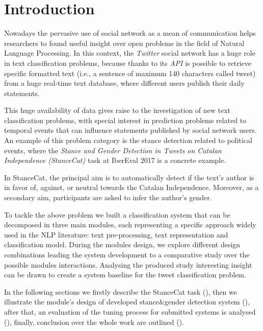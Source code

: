 \section{Introduction} \label{sec:introduction}

Nowadays the pervasive use of social network as a mean of communication helps researchers to found useful insight over open problems in the field of Natural Language Processing. %
In this context, the \emph{Twitter} social network has a huge role in text classification problems, because thanks to its \emph{API} is possible to retrieve specific formatted text (i.e., a sentence of maximum 140 characters called tweet) from a huge real-time text database, where different users publish their daily statements.

This huge availability of data gives raise to the investigation of new text classification problems, with special interest in prediction problems related to temporal events that can influence statements published by social network users. An example of this problem category is the stance detection related to political events, where the  \emph{Stance and Gender Detection in Tweets on Catalan Independence (StanceCat)} task at IberEval 2017 is a concrete example. %

In StanceCat, the principal aim is to automatically detect if the text's author is in favor of, against, or neutral towards the Catalan Independence. Moreover, as a secondary aim, participants are asked to infer the author's gender. 

To tackle the above problem we built a classification system that can be decomposed in three main modules, each representing a specific approach widely used in the NLP literature: text pre-processing, text representation and classification model.
During the modules design, we explore different design combinations leading the system development to a comparative study over the possible modules interactions.
Analysing the produced study interesting insight can be drawn to create a system baseline for the tweet classification problem.

In the following sections we firstly describe the StanceCat task (), then we illustrate the module's design of developed stance\&gender detection system (), after that, an evaluation of the tuning process for submitted systems is analysed (), finally, conclusion over the whole work are outlined ().
